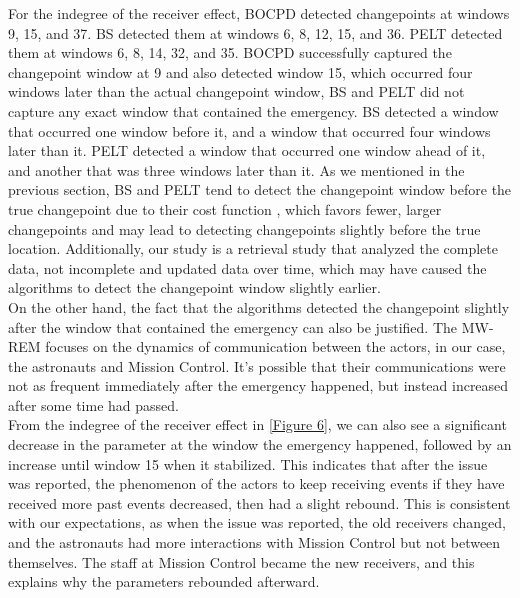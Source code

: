 \documentclass[]{interact}
\theoremstyle{plain}%
\theoremstyle{definition}
\theoremstyle{remark}
\begin{document}
{	
	
	
	
	
	
	
	
	
	
	
	
	
	
	
	For the indegree of the receiver effect, BOCPD detected changepoints at windows 9, 15, and 37. BS detected them at windows 6, 8, 12, 15, and 36. PELT detected them at windows 6, 8, 14, 32, and 35. BOCPD successfully captured the changepoint window at 9 and also detected window 15, which occurred four windows later than the actual changepoint window, BS and PELT did not capture any exact window that contained the emergency. BS detected a window that occurred one window before it, and a window that occurred four windows later than it. PELT detected a window that occurred one window ahead of it, and another that was three windows later than it. As we mentioned in the previous section, BS and PELT tend to detect the changepoint window before the true changepoint due to their cost function \cite{killickOptimalDetectionChangepoints2012}, which favors fewer, larger changepoints and may lead to detecting changepoints slightly before the true location. Additionally, our study is a retrieval study that analyzed the complete data, not incomplete and updated data over time, which may have caused the algorithms to detect the changepoint window slightly earlier. \\
	
	On the other hand, the fact that the algorithms detected the changepoint slightly after the window that contained the emergency can also be justified. The MW-REM focuses on the dynamics of communication between the actors, in our case, the astronauts and Mission Control. It's possible that their communications were not as frequent immediately after the emergency happened, but instead increased after some time had passed. \\
	
	From the indegree of the receiver effect in \autoref{Figure 6}, we can also see a significant decrease in the parameter at the window the emergency happened, followed by an increase until window 15 when it stabilized. This indicates that after the issue was reported, the phenomenon of the actors to keep receiving events if they have received more past events decreased, then had a slight rebound. This is consistent with our expectations, as when the issue was reported, the old receivers changed, and the astronauts had more interactions with Mission Control but not between themselves. The staff at Mission Control became the new receivers, and this explains why the parameters rebounded afterward. \\
	
}
\end{document}
